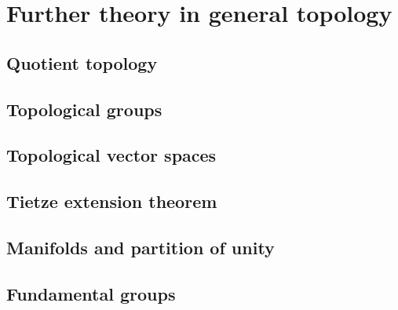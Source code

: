 \part{Further theory in general topology}
\chapter{Quotient topology}\label{quotient topology}
    
    
\chapter{Topological groups}\label{topological groups}
    
    
    
\chapter{Topological vector spaces}\label{topological vector spaces}
    
    
\chapter{Tietze extension theorem}\label{Tietze extn thm}
\chapter{Manifolds and partition of unity}\label{manifolds and partition of unity}
\chapter{Fundamental groups}\label{fundamental groups}

